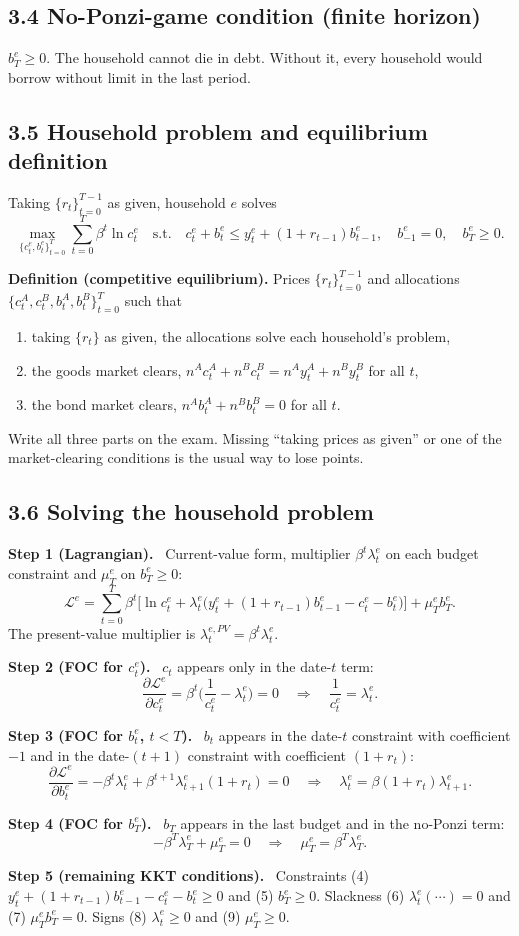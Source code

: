 \documentclass[12pt]{article}
\newcommand{\st}[1]{\par\smallskip\textbf{Step #1.}\ }
\begin{document}
\subsection*{3.4 No-Ponzi-game condition (finite horizon)}
$b^e_T\ge0$. The household cannot die in debt. Without it, every household
would borrow without limit in the last period.

\subsection*{3.5 Household problem and equilibrium definition}
Taking $\{r_t\}_{t=0}^{T-1}$ as given, household $e$ solves
\[
\max_{\{c^e_t,b^e_t\}_{t=0}^T}\sum_{t=0}^T\beta^t\ln c^e_t
\quad\text{s.t.}\quad c^e_t+b^e_t\le y^e_t+(1+r_{t-1})b^e_{t-1},\quad b^e_{-1}=0,\quad b^e_T\ge0 .
\]

\textbf{Definition (competitive equilibrium).} Prices $\{r_t\}_{t=0}^{T-1}$ and
allocations $\{c^A_t,c^B_t,b^A_t,b^B_t\}_{t=0}^T$ such that
\begin{enumerate}
\item taking $\{r_t\}$ as given, the allocations solve each household's problem,
\item the goods market clears, $n^Ac^A_t+n^Bc^B_t=n^Ay^A_t+n^By^B_t$ for all $t$,
\item the bond market clears, $n^Ab^A_t+n^Bb^B_t=0$ for all $t$.
\end{enumerate}
Write all three parts on the exam. Missing ``taking prices as given'' or one of
the market-clearing conditions is the usual way to lose points.

\subsection*{3.6 Solving the household problem}
\st{1 (Lagrangian)} Current-value form, multiplier $\beta^t\lambda^e_t$ on each
budget constraint and $\mu^e_T$ on $b^e_T\ge0$:
\[
\mathcal L^e=\sum_{t=0}^T\beta^t\Big[\ln c^e_t+\lambda^e_t\big(y^e_t+(1+r_{t-1})b^e_{t-1}-c^e_t-b^e_t\big)\Big]+\mu^e_Tb^e_T .
\]
The present-value multiplier is $\lambda^{e,PV}_t=\beta^t\lambda^e_t$.

\st{2 (FOC for $c^e_t$)} $c_t$ appears only in the date-$t$ term:
\[
\frac{\partial\mathcal L^e}{\partial c^e_t}=\beta^t\Big(\frac{1}{c^e_t}-\lambda^e_t\Big)=0
\quad\Longrightarrow\quad\frac{1}{c^e_t}=\lambda^e_t .\tag{1}
\]
\st{3 (FOC for $b^e_t$, $t<T$)} $b_t$ appears in the date-$t$ constraint with
coefficient $-1$ and in the date-$(t+1)$ constraint with coefficient $(1+r_t)$:
\[
\frac{\partial\mathcal L^e}{\partial b^e_t}=-\beta^t\lambda^e_t+\beta^{t+1}\lambda^e_{t+1}(1+r_t)=0
\quad\Longrightarrow\quad\lambda^e_t=\beta(1+r_t)\lambda^e_{t+1}.\tag{2}
\]
\st{4 (FOC for $b^e_T$)} $b_T$ appears in the last budget and in the no-Ponzi term:
\[
-\beta^T\lambda^e_T+\mu^e_T=0\quad\Longrightarrow\quad\mu^e_T=\beta^T\lambda^e_T .\tag{3}
\]
\st{5 (remaining KKT conditions)} Constraints (4) $y^e_t+(1+r_{t-1})b^e_{t-1}-c^e_t-b^e_t\ge0$
and (5) $b^e_T\ge0$. Slackness (6) $\lambda^e_t(\cdots)=0$ and (7) $\mu^e_Tb^e_T=0$.
Signs (8) $\lambda^e_t\ge0$ and (9) $\mu^e_T\ge0$.
\end{document}
